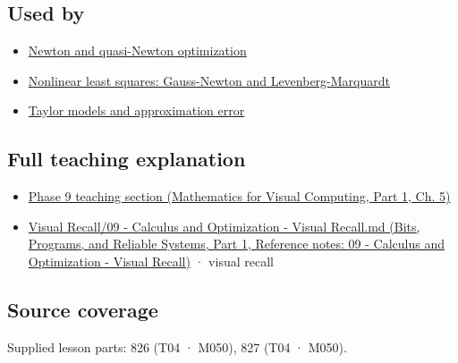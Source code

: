 \subsection{Used by}\label{appendix-6ac071f8b50c-used-by}

\hypertarget{appendix-6ac071f8b50c-used-by}{}

\begin{itemize}
\tightlist
\item
  \hyperref[appendix-54c8f5828387]{Newton and quasi-Newton optimization}
\item
  \hyperref[appendix-2c2df8345991]{Nonlinear least squares: Gauss-Newton and Levenberg-Marquardt}
\item
  \hyperref[appendix-32f39e9a3738]{Taylor models and approximation error}
\end{itemize}

\subsection{Full teaching explanation}\label{appendix-6ac071f8b50c-full-teaching-explanation}

\hypertarget{appendix-6ac071f8b50c-full-teaching-explanation}{}

\begin{itemize}
\tightlist
\item
  \href{../02-Mathematics-for-Visual-Computing-P01/main.pdf\#02-foundations-ii-ch021-jacobians-curvature-and-local-approximation}{Phase 9 teaching section (Mathematics for Visual Computing, Part 1, Ch. 5)}
\item
  \href{../01-Bits-Programs-and-Reliable-Systems-P01/main.pdf\#appendix-adf48f5dc5c1}{Visual Recall/09 - Calculus and Optimization - Visual Recall.md (Bits, Programs, and Reliable Systems, Part 1, Reference notes: 09 - Calculus and Optimization - Visual Recall)} · visual recall
\end{itemize}

\subsection{Source coverage}\label{appendix-6ac071f8b50c-source-coverage}

\hypertarget{appendix-6ac071f8b50c-source-coverage}{}

Supplied lesson parts: 826 (T04 · M050), 827 (T04 · M050).
